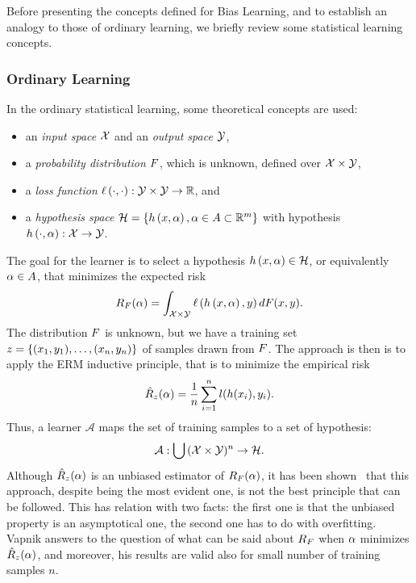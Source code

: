 Before presenting the concepts defined for Bias Learning, and to establish an analogy to those of ordinary learning, we briefly review some statistical learning concepts.
\subsubsection*{Ordinary Learning}
In the ordinary statistical learning, some theoretical concepts are used:
\begin{itemize}
    \item an \emph{input space} $\mathcal{X}$ and an \emph{output space} $\mathcal{Y}$,
    \item a \emph{probability distribution} $F$, which is unknown, defined over $\mathcal{X} \times \mathcal{Y}$,
    \item a \emph{loss function} $\ell\left( \cdot, \cdot\right):\mathcal{Y} \times \mathcal{Y} \to \mathbb{R}$, and
    \item a \emph{hypothesis space} $\mathcal{H} = \left\{h\left(x, \alpha\right), \alpha \in A \subset \mathbb{R}^m\right\}$ with hypothesis $h\left(\cdot, \alpha\right): \mathcal{X} \to \mathcal{Y}$.
\end{itemize}
The goal for the learner is to select a hypothesis $h\left(x, \alpha\right) \in \mathcal{H}$, or equivalently $\alpha \in A$, that minimizes the expected risk
$$ R_F(\alpha) =  \int_{\mathcal{X} \times \mathcal{Y}} \ell\left( h\left(x, \alpha\right), y\right) dF(x, y) .$$
The distribution $F$ is unknown, but we have a training set $z = \{(x_1, y_1), \ldots, (x_n, y_n)\}$ of samples drawn from $F$. 
The approach is then is to apply the ERM inductive principle, that is to minimize the empirical risk
$$ \hat{R}_z(\alpha) = \frac{1}{n} \sum_{i=1}^n l(h(x_i), y_i).$$
Thus, a learner $\mathcal{A}$ maps the set of training samples to a set of hypothesis:
\begin{equation}
    \nonumber
    \mathcal{A} : \bigcup {(\mathcal{X}\times \mathcal{Y})^n} \to \mathcal{H}.
\end{equation}
Although $\hat{R}_z(\alpha)$ is an unbiased estimator of $R_F(\alpha)$, it has been shown~\cite{vapnik2013nature} that this approach, despite being the most evident one, is not the best principle that can be followed.
This has relation with two facts: the first one is that the unbiased property is an asymptotical one, the second one has to do with overfitting.
Vapnik answers to the question of what can be said about $R_F$ when $\alpha$ minimizes $\hat{R}_z(\alpha)$, and moreover, his results are valid also for small number of training samples $n$.
